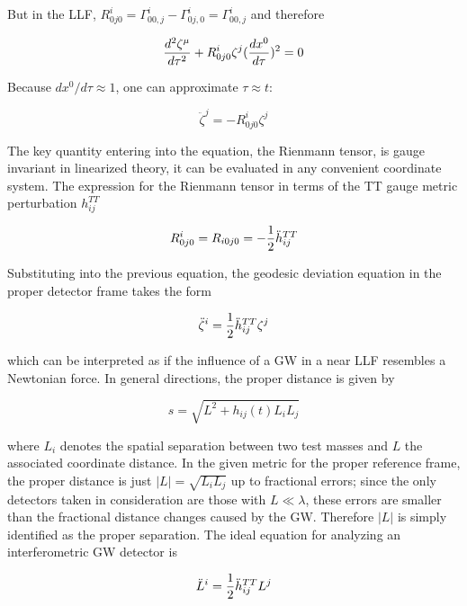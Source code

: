 \documentclass[binding=0.6cm, LaM]{sapthesis}
\begin{document}
	But in the LLF, $R^i_{0j0} = \Gamma^i_{00,j} - \Gamma^i_{0j,0} = \Gamma^i_{00,j}$ and therefore

		\begin{equation}
		{{d^2\zeta^{\mu}}\over{d\tau^2}} + R^i_{0j0} \zeta^j({{dx^0}\over{d\tau}})^2 = 0
		\end{equation}

	Because $dx^0/d\tau \approx 1$, one can approximate $\tau \approx t$:

		\begin{equation}
		{\ddot \zeta}^j = - R^i_{0j0}\zeta^j
		\end{equation}
	
	The key quantity entering into the equation, the Rienmann tensor, is gauge invariant in linearized theory, 
	it can be evaluated in any convenient coordinate system.
	The expression for the Rienmann tensor in terms of the TT gauge metric perturbation $h_{ij}^{TT}$

		\begin{equation}
		R^i_{0j0} = R_{i0j0} = - {1 \over 2}{\ddot h}_{ij}^{TT}
		\end{equation}

	Substituting into the previous equation, the geodesic deviation equation in the proper detector frame takes the form

		\begin{equation}
		{\ddot \zeta}^i = {1 \over 2}{\ddot h}_{ij}^{TT}\zeta^j
		\end{equation}

	which can be interpreted as if the influence of a GW in a near LLF resembles a Newtonian force.
	In general directions, the proper distance is given by

		\begin{equation}
		s = \sqrt{L^2 + h_{ij}(t)L_{i}L_{j}}
		\end{equation}

	where $L_i$ denotes the spatial separation between two test masses and $L$ the associated coordinate distance.
	In the given metric for the proper reference frame, the proper distance is just $|L| = \sqrt{L_iL_j}$ up to fractional errors; 
	since the only detectors taken in consideration are those
	with $L \ll \lambda$, these errors are smaller than the fractional distance changes caused by the GW.
	Therefore $|L|$ is simply identified as the proper separation. The ideal equation for analyzing an interferometric GW detector is

		\begin{equation}
		{\ddot L}^i = {1 \over 2}{\ddot h}_{ij}^{TT}L^j
		\end{equation}
\end{document}
